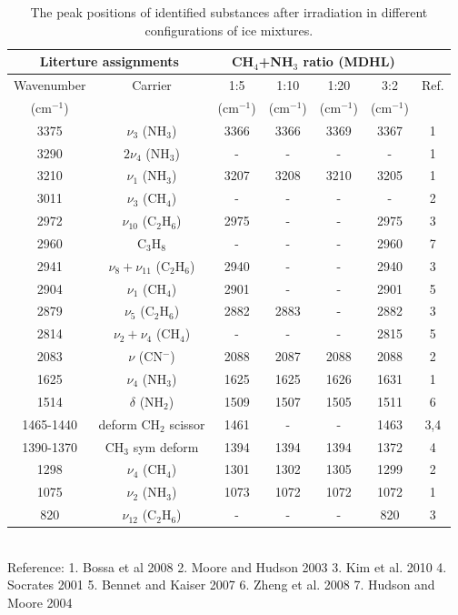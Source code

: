 \begin{table}[htbp]
\caption{The peak positions of identified substances after irradiation in different configurations of ice mixtures.}
\label{tab:WavenumberMDHL}
\begin{tabular}{ccccccc}
\hline
\hline
\multicolumn{2}{c}{Literture assignments} & \multicolumn{4}{c}{CH$_4$+NH$_3$ ratio (MDHL)} &  \\
\hline
Wavenumber & Carrier  & 1:5  & 1:10  & 1:20  & 3:2  & Ref. \\
(cm$^{-1}$) &   & (cm$^{-1}$) & (cm$^{-1}$) & (cm$^{-1}$) & (cm$^{-1}$) &\\
\hline
3375 & $\nu_3$ (NH$_3$) & 3366 & 3366 & 3369 & 3367 & 1 \\
3290 & $2\nu_4$ (NH$_3$) & - & - & - & - & 1 \\
3210 & $\nu_1$ (NH$_3$) & 3207 & 3208 & 3210 & 3205 & 1 \\
3011 & $\nu_3$ (CH$_4$) & - & - & - & - & 2 \\
2972 & $\nu_{10}$ (C$_2$H$_6$) & 2975 & - & - & 2975 & 3 \\
2960 & C$_3$H$_8$ & - & - & - & 2960 & 7 \\
2941 & $\nu_8+\nu_11$ (C$_2$H$_6$) & 2940 & - & - & 2940 & 3 \\
2904 & $\nu_1$ (CH$_4$) & 2901 & - & - & 2901 & 5 \\
2879 & $\nu_5$ (C$_2$H$_6$) & 2882 & 2883 & - & 2882 & 3 \\
2814 & $\nu_2+\nu_4$ (CH$_4$) & - & - & - & 2815 & 5 \\
2083 & $\nu$ (CN$^-$) & 2088 & 2087 & 2088 & 2088 & 2 \\
1625 & $\nu_4$ (NH$_3$) & 1625 & 1625 & 1626 & 1631 & 1 \\
1514 & $\delta$ (NH$_2$) & 1509 & 1507 & 1505 & 1511 & 6 \\
1465-1440 & deform CH$_2$ scissor & 1461 & - & - & 1463 & 3,4 \\
1390-1370 & CH$_3$ sym deform & 1394 & 1394 & 1394 & 1372 & 4 \\
1298 & $\nu_4$ (CH$_4$) & 1301 & 1302 & 1305 & 1299 & 2 \\
1075 & $\nu_2$ (NH$_3$) & 1073 & 1072 & 1072 & 1072 & 1 \\
820 & $\nu_12$ (C$_2$H$_6$) & - & - & - & 820 & 3 \\
\hline
\end{tabular}\\
Reference: 1. Bossa et al 2008 2. Moore and Hudson 2003 3. Kim et al. 2010 4. Socrates 2001 5. Bennet and Kaiser 2007 6. Zheng et al. 2008 7. Hudson and Moore 2004
\end{table}


